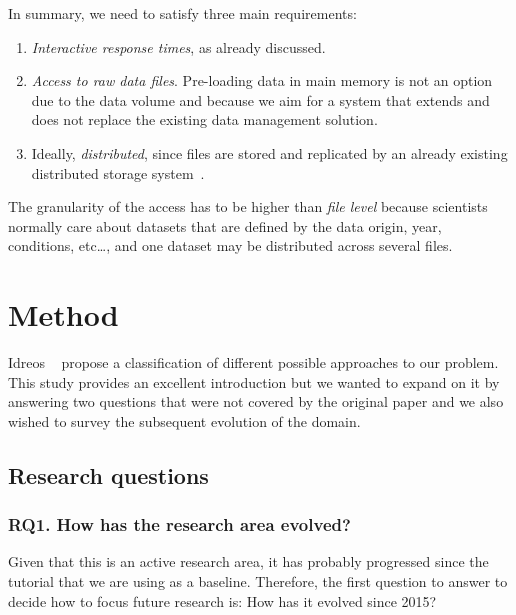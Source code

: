
In summary, we need to satisfy three main requirements:

\begin{enumerate}
  \item \emph{Interactive response times}, as already discussed.
  \item \emph{Access to raw data files}. Pre-loading data in main memory is not an
    option due to the data volume and because we aim for a system that extends and does
    not replace the existing data management solution.
  \item Ideally, \emph{distributed}, since files are stored and replicated by an already existing
    distributed storage system~\cite{Baud2012}.
\end{enumerate}

The granularity of the access has to be higher than \emph{file level} because
scientists normally care about datasets that are defined by the data origin,
year, conditions, etc\ldots, and one dataset may be distributed across
several files.

\section{Method}
\label{sec:mapping/method}

Idreos \etal~\cite{Idreos2015} propose a classification of different possible approaches
to our problem.
This study provides an excellent introduction but we wanted to expand on it by answering
two questions that were not covered by the original paper and we also wished to survey
the subsequent evolution of the domain.

\subsection{Research questions}
\label{sec:mapping/research_questions}

\subsubsection{RQ1. How has the research area evolved?}
Given that this is an active research area, it has probably progressed since
the tutorial that we are using as a baseline. Therefore, the first
question to answer to decide how to focus future research is:
How has it evolved since 2015?

